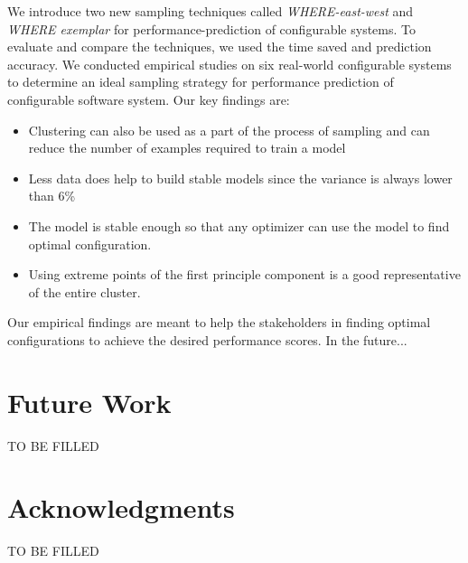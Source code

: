 \documentclass{sig-alternative}
\newcommand{\bi}{\begin{itemize}}%
\newcommand{\ei}{\end{itemize}}
\begin{document}
We introduce two new sampling techniques called \textit{WHERE-east-west} and \textit{WHERE exemplar} for performance-prediction of configurable systems. To evaluate and compare the techniques, we used the time saved and prediction accuracy. We conducted empirical studies on six real-world configurable systems to determine an ideal sampling strategy for performance prediction of configurable software system. Our key findings are:
\bi
    \item{Clustering can also be used as a part of the process of sampling and can reduce the number of examples required to train a model}
    \item{Less data does help to build stable models since the variance is always lower than 6\%}
    \item{The model is stable enough so that any optimizer can use the model to find optimal configuration.}
    \item{Using extreme points of the first principle component is a good representative of the entire cluster.}
\ei

Our empirical findings are meant to help the stakeholders in finding optimal configurations to achieve the desired performance scores. In the future...

\section{Future Work}

TO BE FILLED
 
 

\section*{Acknowledgments}
TO BE FILLED
 
\vspace*{0.5mm}
 
 


\balance
  

   



  


  
\end{document}
